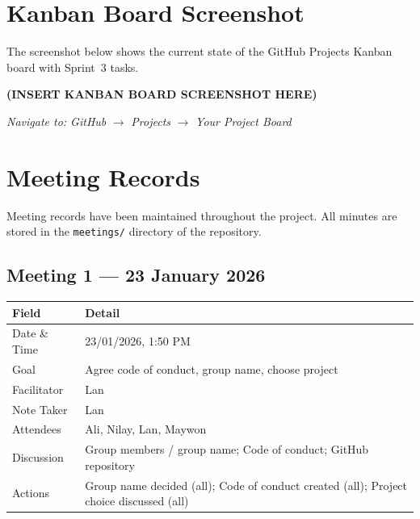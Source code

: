 \documentclass[11pt,a4paper]{article}
\begin{document}
\newpage

\section{Kanban Board Screenshot}

The screenshot below shows the current state of the GitHub Projects Kanban board with Sprint~3 tasks.



\textbf{(INSERT KANBAN BOARD SCREENSHOT HERE)}

\textit{Navigate to: GitHub} $\rightarrow$ \textit{Projects} $\rightarrow$ \textit{Your Project Board}

\newpage

\section{Meeting Records}

Meeting records have been maintained throughout the project. All minutes are stored in the \texttt{meetings/} directory of the repository.

\subsection{Meeting 1 — 23 January 2026}
\begin{table}[H]
\centering
\begin{tabularx}{\textwidth}{lX}
    \toprule
    \textbf{Field} & \textbf{Detail} \\
    \midrule
    Date \& Time    & 23/01/2026, 1:50 PM \\
    Goal            & Agree code of conduct, group name, choose project \\
    Facilitator     & Lan \\
    Note Taker      & Lan \\
    Attendees       & Ali, Nilay, Lan, Maywon \\
    \midrule
    Discussion      & Group members / group name; Code of conduct; GitHub repository \\
    Actions         & Group name decided (all); Code of conduct created (all); Project choice discussed (all) \\
    \bottomrule
\end{tabularx}
\end{table}
\end{document}
